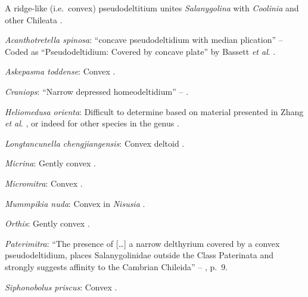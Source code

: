 \documentclass[openany]{book}
\theoremstyle{definition}
\theoremstyle{definition}
\theoremstyle{definition}
\theoremstyle{remark}
\begin{document}
A ridge-like (i.e.~convex) pseudodeltitium unites \emph{Salanygolina}
with \emph{Coolinia} and other Chileata
\citep[p.~6]{Holmer2009Theenigmatic}.

\hypertarget{Acanthotretella_spinosa-coding-112}{}
\emph{Acanthotretella spinosa}: ``concave pseudodeltidium with median
plication'' -- \citet{Williams2000LinguliformeaCraniiformea}\\
Coded as ``Pseudodeltidium: Covered by concave plate'' by Bassett
\emph{et al}. \citeyearpar{Bassett2001Functionalmorphology}.

\hypertarget{Askepasma_toddense-coding-112}{}
\emph{Askepasma toddense}: Convex \citep[fig.
508]{Williams2000LinguliformeaCraniiformea}.

\hypertarget{Craniops-coding-112}{}
\emph{Craniops}: ``Narrow depressed homeodeltidium'' --
\citet{Hanken1985Thetaxonomy}.

\hypertarget{Heliomedusa_orienta-coding-112}{}
\emph{Heliomedusa orienta}: Difficult to determine based on material
presented in Zhang \emph{et al}.
\citeyearpar{Zhang2007Rhynchonelliformeanbrachiopods}, or indeed for
other species in the genus
\citep[e.g.][]{Williams2000LinguliformeaCraniiformea, Skovsted2005EarlyCambrian, Holmer2018Theattachment}.

\hypertarget{Longtancunella_chengjiangensis-coding-112}{}
\emph{Longtancunella chengjiangensis}: Convex deltoid
\citep{Holmer2008TheEarly}.

\hypertarget{Micrina-coding-112}{}
\emph{Micrina}: Gently convex \citep[see][fig.
83.3]{Williams2000LinguliformeaCraniiformea}.

\hypertarget{Micromitra-coding-112}{}
\emph{Micromitra}: Convex \citep[see][fig.
4B]{Balthasar2004Shellstructure}.

\hypertarget{Mummpikia_nuda-coding-112}{}
\emph{Mummpikia nuda}: Convex in \emph{Nisusia} \citep[see][fig.
8.4]{Rowell1985Theevolutionary}.

\hypertarget{Orthis-coding-112}{}
\emph{Orthis}: Gently convex \citep[see][fig.
83.1]{Williams2000LinguliformeaCraniiformea}.

\hypertarget{Paterimitra-coding-112}{}
\emph{Paterimitra}: ``The presence of {[}\ldots{}{]} a narrow delthyrium
covered by a convex pseudodeltidium, places Salanygolinidae outside the
Class Paterinata and strongly suggests affinity to the Cambrian
Chileida'' -- \citet{Holmer2009Theenigmatic}, p.~9.

\hypertarget{Siphonobolus_priscus-coding-112}{}
\emph{Siphonobolus priscus}: Convex \citep{Streng2016Anew}.
\end{document}
